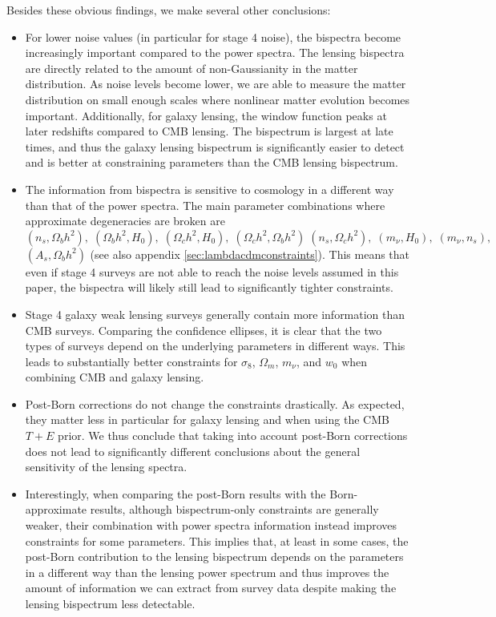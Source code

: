 \documentclass[11pt]{article} %
\begin{document}
Besides these obvious findings, we make several other conclusions:
\begin{itemize}
    \item For lower noise values (in particular for stage 4 noise), the bispectra become increasingly important compared to the power spectra. The lensing bispectra are directly related to the amount of non-Gaussianity in the matter distribution. As noise levels become lower, we are able to measure the matter distribution on small enough scales where nonlinear matter evolution becomes important. Additionally, for galaxy lensing, the window function peaks at later redshifts compared to CMB lensing. The bispectrum is largest at late times, and thus the galaxy lensing bispectrum is significantly easier to detect and is better at constraining parameters than the CMB lensing bispectrum.

    \item The information from bispectra is sensitive to cosmology in a different way than that of the power spectra. The main parameter combinations where approximate degeneracies are broken are $(n_s,\Omega_b h^2),\;(\Omega_b h^2,H_0),\;(\Omega_c h^2,H_0),\;(\Omega_c h^2,\Omega_b h^2)\;(n_s,\Omega_c h^2),\;(m_\nu,H_0),\;(m_\nu,n_s),$ $(A_s,\Omega_b h^2)$ (see also appendix \ref{sec:lambdacdmconstraints}). This means that even if stage 4 surveys are not able to reach the noise levels assumed in this paper, the bispectra will likely still lead to significantly tighter constraints.

    \item Stage 4 galaxy weak lensing surveys generally contain more information than CMB surveys. 
    Comparing the confidence ellipses, it is clear that the two types of surveys depend on the underlying parameters in different ways. This leads to substantially better constraints for $\sigma_8$, $\Omega_m$, $m_\nu$, and $w_0$ when combining CMB and galaxy lensing.

    \item Post-Born corrections do not change the constraints drastically. As expected, they matter less in particular for galaxy lensing and when using the CMB $T+E$ prior. We thus conclude that taking into account post-Born corrections does not lead to significantly different conclusions about the general sensitivity of the lensing spectra.
    
    \item Interestingly, when comparing the post-Born results with the Born-approximate results, although bispectrum-only constraints are generally weaker, their combination with power spectra information instead improves constraints for some parameters. This implies that, at least in some cases, the post-Born contribution to the lensing bispectrum depends on the parameters in a different way than the lensing power spectrum and thus improves the amount of information we can extract from survey data despite making the lensing bispectrum less detectable. 
\end{itemize}
\end{document}

